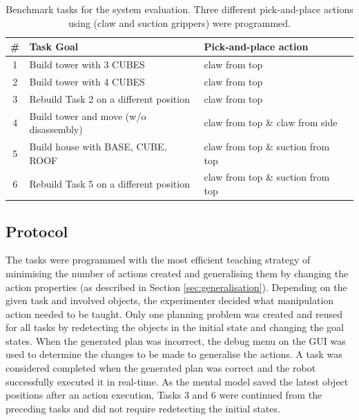 \begin{table}[h]
	\begin{center}
		\caption{Benchmark tasks for the system evaluation. Three different pick-and-place actions using (claw and suction grippers) were programmed.}
		\label{table:task-list}
		\begin{tabular}{clll}
			\# & Task Goal & Pick-and-place action\\ \hline
			1 & Build tower with 3 CUBES & claw from top \\
			2 & Build tower with 4 CUBES & claw from top \\
			3 & Rebuild Task 2 on a different position & claw from top \\
			4 & Build tower and move (w/o disassembly) & claw from top \& claw from side \\
			5 & Build house with BASE, CUBE, ROOF & claw from top \& suction from top \\
			6 & Rebuild Task 5 on a different position & claw from top \& suction from top \\
		\end{tabular}
	\end{center}
\end{table}

\subsection{Protocol}
The tasks were programmed with the most efficient teaching strategy of minimising the number of actions created and generalising them by changing the action properties (as described in Section \ref{sec:generalisation}).
Depending on the given task and involved objects, the experimenter decided what manipulation action needed to be taught.
Only one planning problem was created and reused for all tasks by redetecting the objects in the initial state and changing the goal states.
When the generated plan was incorrect, the debug menu on the GUI was used to determine the changes to be made to generalise the actions.
A task was considered completed when the generated plan was correct and the robot successfully executed it in real-time.
As the mental model saved the latest object positions after an action execution, Tasks 3 and 6 were continued from the preceding tasks and did not require redetecting the initial states. 


